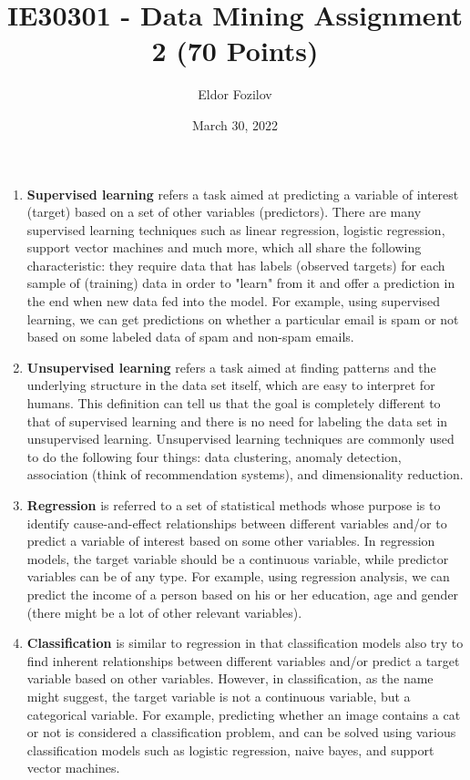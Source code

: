 \documentclass{homework2_template}
\title{IE30301 - Data Mining Assignment 2 (70 Points)}
\author{Eldor Fozilov}
\date{March 30, 2022}
\begin{document}
    \maketitle
    \exercise
    \subsection{}
\begin{enumerate}
  \item \textbf{Supervised learning} refers a task aimed at predicting a variable of interest (target) based on a set of other variables (predictors). There are many supervised learning techniques such as linear regression, logistic regression, support vector machines and much more, which all share the following characteristic: they require data that has labels (observed targets) for each sample of (training) data in order to "learn" from it and offer a prediction in the end when new data fed into the model. For example, using supervised learning, we can get predictions on whether a particular email is spam or not based on some labeled data of spam and non-spam emails.
  
  \item \textbf{Unsupervised learning} refers a task aimed at finding patterns and the underlying structure in the data set itself, which are easy to interpret for humans. This definition can tell us that the goal is completely different to that of supervised learning and there is no need for labeling the data set in unsupervised learning. Unsupervised learning techniques are commonly used to do the following four things: data clustering, anomaly detection, association (think of recommendation systems), and dimensionality reduction.  
  
  \item \textbf{Regression} is referred to a set of statistical methods whose purpose is to identify cause-and-effect relationships between different variables and/or to predict a variable of interest based on some other variables. In regression models, the target variable should be a continuous variable, while predictor variables can be of any type. For example, using regression analysis, we can predict the income of a person based on his or her education, age and gender (there might be a lot of other relevant variables). 
  
  \item \textbf{Classification} is similar to regression in that classification models also try to find inherent relationships between different variables and/or predict a target variable based on other variables. However, in classification, as the name might suggest, the target variable is not a continuous variable, but a categorical variable. For example, predicting whether an image contains a cat or not is considered a classification problem, and can be solved using various classification models such as logistic regression, naive bayes, and support vector machines.
  

\end{enumerate}
\end{document}
